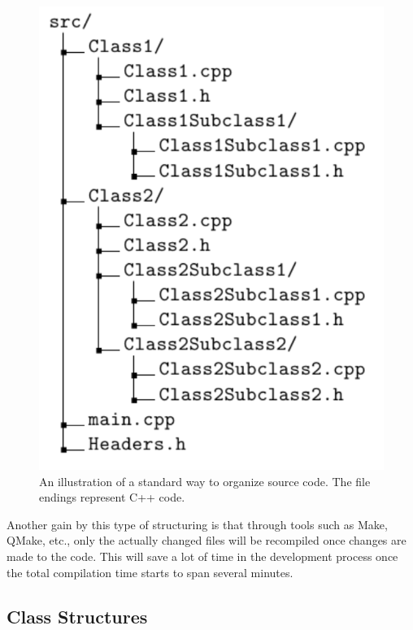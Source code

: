 \begin{figure}[h]
 
 \begin{center}
  \includegraphics[scale=0.6]{../Graphics/SRCfolderStruct.pdf} 
 \end{center}

 \caption{An illustration of a standard way to organize source code. The file endings represent C++ code.}
 \label{FIG:SRCdirTree}
\end{figure}

Another gain by this type of structuring is that through tools such as Make, QMake, etc., only the actually changed files will be recompiled once changes are made to the code. This will save a lot of time in the development process once the total compilation time starts to span several minutes.

\subsection{Class Structures}

